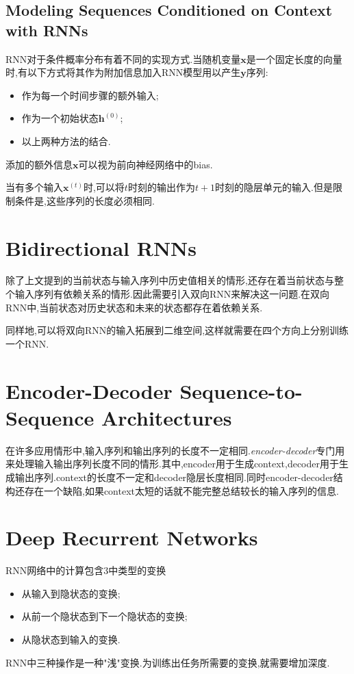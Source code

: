 \subsection{Modeling Sequences Conditioned on Context with RNNs}

RNN对于条件概率分布有着不同的实现方式.当随机变量$\bm x$是一个固定长度的向量时,有以下方式将其作为附加信息加入RNN模型用以产生$\bm y$序列:
\begin{itemize}
    \item 作为每一个时间步骤的额外输入;
    \item 作为一个初始状态$\bm h^{(0)}$;
    \item 以上两种方法的结合.
\end{itemize}
添加的额外信息$\bm x$可以视为前向神经网络中的bias.

当有多个输入$\bm x^{(t)}$时,可以将$t$时刻的输出作为$t+1$时刻的隐层单元的输入.但是限制条件是,这些序列的长度必须相同.

\section{Bidirectional RNNs}

除了上文提到的当前状态与输入序列中历史值相关的情形,还存在着当前状态与整个输入序列有依赖关系的情形.因此需要引入双向RNN来解决这一问题.在双向RNN中,当前状态对历史状态和未来的状态都存在着依赖关系.

同样地,可以将双向RNN的输入拓展到二维空间,这样就需要在四个方向上分别训练一个RNN.

\section{Encoder-Decoder Sequence-to-Sequence Architectures}

在许多应用情形中,输入序列和输出序列的长度不一定相同.\textit{encoder-decoder}专门用来处理输入输出序列长度不同的情形.其中,encoder用于生成context,decoder用于生成输出序列.context的长度不一定和decoder隐层长度相同.同时encoder-decoder结构还存在一个缺陷,如果context太短的话就不能完整总结较长的输入序列的信息.

\section{Deep Recurrent Networks}

RNN网络中的计算包含3中类型的变换
\begin{itemize}
    \item 从输入到隐状态的变换;
    \item 从前一个隐状态到下一个隐状态的变换;
    \item 从隐状态到输入的变换.
\end{itemize}
RNN中三种操作是一种"浅"变换.为训练出任务所需要的变换,就需要增加深度.

